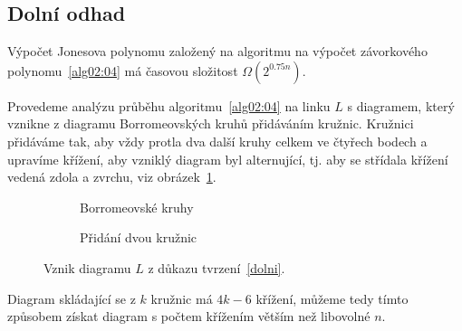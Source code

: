 \subsection{Dolní odhad}

\begin{tvrz} \label{dolni}
Výpočet Jonesova polynomu založený na algoritmu na výpočet závorkového polynomu~\ref{alg02:04} má časovou složitost  $\Omega(2^{0.75 n})$.
\end{tvrz}

\begin{dukaz}
Provedeme analýzu průběhu algoritmu~\ref{alg02:04} na linku $L$ s diagramem, který vznikne z diagramu Borromeovských kruhů přidáváním kružnic. Kružnici přidáváme tak, aby vždy protla dva další kruhy celkem ve čtyřech bodech a upravíme křížení, aby vzniklý diagram byl alternující, tj. aby se střídala křížení vedená zdola a zvrchu, viz obrázek~\ref{borro}.

\begin{figure}[h]  

\centering 
\begin{subfigure}[t]{0.4\linewidth}\centering
{} 
\caption{Borromeovské kruhy} 
\end{subfigure}
\begin{subfigure}[t]{0.4\linewidth}\centering
{}
\caption{Přidání dvou kružnic}
\end{subfigure}
\caption{Vznik diagramu $L$ z důkazu tvrzení~\ref{dolni}.} \label{borro}
\end{figure}  


Diagram skládající se z $k$ kružnic má $4k-6$ křížení, můžeme tedy tímto způsobem získat diagram s počtem křížením větším než libovolné $n$.


\end{dukaz}
